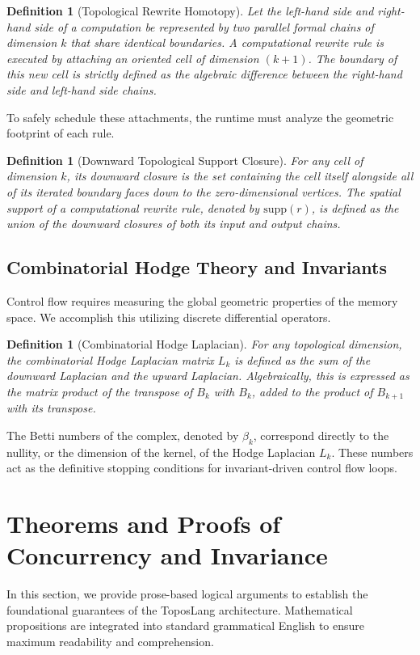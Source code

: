\documentclass[11pt, a4paper]{article}
\newtheorem{definition}[theorem]{Definition}
\begin{document}
\begin{definition}[Topological Rewrite Homotopy]
Let the left-hand side and right-hand side of a computation be represented by two parallel formal chains of dimension $k$ that share identical boundaries. A computational rewrite rule is executed by attaching an oriented cell of dimension $(k+1)$. The boundary of this new cell is strictly defined as the algebraic difference between the right-hand side and left-hand side chains.
\end{definition}

To safely schedule these attachments, the runtime must analyze the geometric footprint of each rule.

\begin{definition}[Downward Topological Support Closure]
For any cell of dimension $k$, its downward closure is the set containing the cell itself alongside all of its iterated boundary faces down to the zero-dimensional vertices. The spatial support of a computational rewrite rule, denoted by $\text{supp}(r)$, is defined as the union of the downward closures of both its input and output chains.
\end{definition}

\subsection{Combinatorial Hodge Theory and Invariants}

Control flow requires measuring the global geometric properties of the memory space. We accomplish this utilizing discrete differential operators.

\begin{definition}[Combinatorial Hodge Laplacian]
For any topological dimension, the combinatorial Hodge Laplacian matrix $L_k$ is defined as the sum of the downward Laplacian and the upward Laplacian. Algebraically, this is expressed as the matrix product of the transpose of $B_k$ with $B_k$, added to the product of $B_{k+1}$ with its transpose.
\end{definition}

The Betti numbers of the complex, denoted by $\beta_k$, correspond directly to the nullity, or the dimension of the kernel, of the Hodge Laplacian $L_k$. These numbers act as the definitive stopping conditions for invariant-driven control flow loops.

\section{Theorems and Proofs of Concurrency and Invariance}
In this section, we provide prose-based logical arguments to establish the foundational guarantees of the ToposLang architecture. Mathematical propositions are integrated into standard grammatical English to ensure maximum readability and comprehension.
\end{document}
